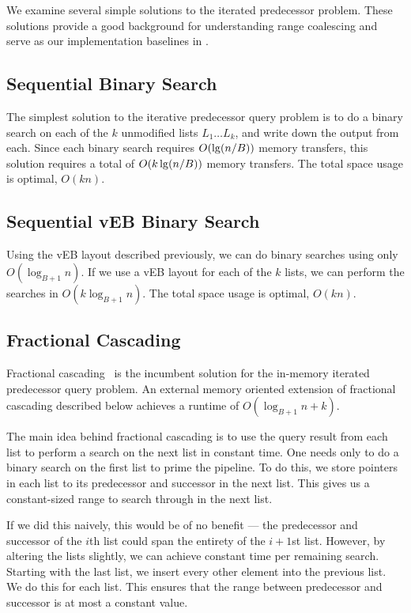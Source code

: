 We examine several simple solutions to the iterated predecessor problem. 
These solutions provide a good background for understanding range coalescing and
serve as our implementation baselines in .

\subsection*{Sequential Binary Search}
The simplest solution to the iterative predecessor query problem 
is to do a binary search on each of the $k$ unmodified lists 
$L_1 \ldots L_k$, and write 
down the output from each. Since each binary search requires $O(\lg \mathopen{}\left(n/B\right)\mathclose{})$ memory transfers, 
this solution requires a total of $O(k \lg \mathopen{}\left(n/B\right)\mathclose{})$ memory transfers. The total space 
usage is optimal, $O(kn)$.

\subsection*{Sequential vEB Binary Search}
Using the vEB layout described previously, we can do binary searches using only 
$O(\log_{B+1} n)$. If we use a vEB layout for each of the $k$ lists, we can perform 
the searches in $O(k \log_{B+1} n)$. The total space usage is optimal, $O(kn)$.

\subsection*{Fractional Cascading}
Fractional cascading~\cite{ChazelleGu86} is the incumbent solution for the in-memory iterated 
predecessor query problem. An external memory oriented extension of fractional cascading
described below achieves a runtime of $O(\log_{B+1} n + k)$.

The main idea behind fractional cascading is to use the query result from 
each list to perform a search on the next list in 
constant time.  One needs only to do a binary search on the first list to prime the
pipeline.  To do this, we store pointers in each list to its predecessor and 
successor in the next list. This gives us a constant-sized range to 
search through in the next list.

If we did this naively, this would be of no benefit --- the predecessor and 
successor of the $i$th list could span the entirety of the $i+1$st list. 
However, by altering the lists slightly, 
we can achieve constant time per remaining search. Starting with the last list, 
we insert every other element into the previous list. We do this for each list. 
This ensures that the range between predecessor and successor is at most a constant value.

